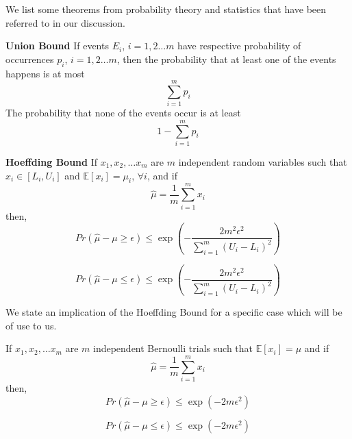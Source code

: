 We list some theorems from probability theory and statistics that have been referred to in our discussion.

\begin{lemma} \textbf{Union Bound}
\label{lemma:union_bound}
If events $E_i$, $i=1,2 \hdots m$ have respective probability of occurrences $p_i$, $i=1,2 \hdots m$, then the probability that at least one of the events happens is at most 
\begin{equation}
\displaystyle\sum\limits_{i=1}^{m} p_i
\end{equation}
The probability that none of the events occur is at least
\begin{equation}
1- \displaystyle\sum\limits_{i=1}^{m} p_i
\end{equation}
\end{lemma}	


\begin{lemma} \textbf{Hoeffding Bound}
\label{lemma:hoeffding_bound}
If $x_1, x_2, \hdots x_m$ are $m$ independent random variables such that $x_i \in \left[L_i, U_i \right]$
and $\mathbb{E}[x_i] = \mu_i$, $\forall i$, and if 	
\[
\hat{\mu} = \frac{1}{m}\displaystyle\sum\limits_{i=1}^{m} x_i
\]
then, 
\begin{equation}
Pr\left( \hat{\mu} - \mu \geq \epsilon \right) \leq  \exp \left( - \frac{2m^2\epsilon^2}{\sum_{i=1}^{m} (U_i - L_i)^2} \right)
\end{equation}

\begin{equation}
Pr\left( \hat{\mu} - \mu \leq \epsilon \right) \leq \exp \left( - \frac{2m^2\epsilon^2}{\sum_{i=1}^{m} (U_i - L_i)^2} \right)
\end{equation}
\end{lemma}


We state an implication of the Hoeffding Bound for a specific case which will be of use to us.
\begin{lemma} 
\label{lemma:bernoulli}
If $x_1, x_2, \hdots x_m$ are $m$ independent Bernoulli trials such that $\mathbb{E}[x_i] = \mu$
and if 
\[\hat{\mu} = \frac{1}{m}\displaystyle\sum\limits_{i=1}^{m} x_i
\]
then, 
\begin{equation}
Pr\left( \hat{\mu} - \mu \geq \epsilon \right) \leq  \exp \left( - {2m\epsilon^2} \right)
\end{equation}

\begin{equation}
Pr\left( \hat{\mu} - \mu \leq \epsilon \right) \leq \exp \left( - {2m\epsilon^2}  \right)
\end{equation}
\end{lemma}


